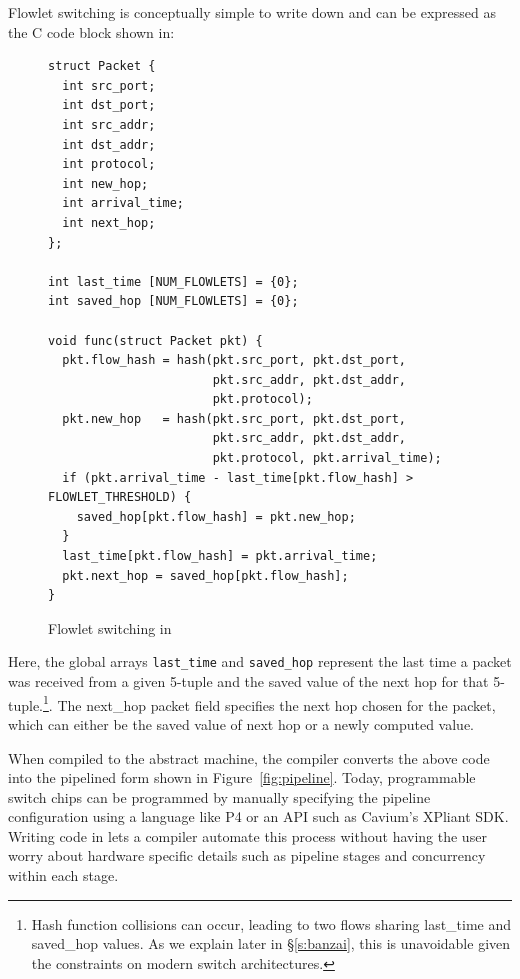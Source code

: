 Flowlet switching is conceptually simple to write down and can be expressed
as the C code block shown in:
\begin{figure}
\begin{small}
\begin{lstlisting}
struct Packet {
  int src_port;
  int dst_port;
  int src_addr;
  int dst_addr;
  int protocol;
  int new_hop;
  int arrival_time;
  int next_hop;
};

int last_time [NUM_FLOWLETS] = {0};
int saved_hop [NUM_FLOWLETS] = {0};

void func(struct Packet pkt) {
  pkt.flow_hash = hash(pkt.src_port, pkt.dst_port,
                       pkt.src_addr, pkt.dst_addr,
                       pkt.protocol);
  pkt.new_hop   = hash(pkt.src_port, pkt.dst_port,
                       pkt.src_addr, pkt.dst_addr,
                       pkt.protocol, pkt.arrival_time);
  if (pkt.arrival_time - last_time[pkt.flow_hash] > FLOWLET_THRESHOLD) {
    saved_hop[pkt.flow_hash] = pkt.new_hop;
  }
  last_time[pkt.flow_hash] = pkt.arrival_time;
  pkt.next_hop = saved_hop[pkt.flow_hash];
}
\end{lstlisting}
\end{small}
\label{fig:flowlet}
\caption{Flowlet switching in \pktlanguage}
\end{figure}

Here, the global arrays \texttt{last\_time} and \texttt{saved\_hop} represent
the last time a packet was received from a given 5-tuple and the saved value of
the next hop for that 5-tuple.\footnote{Hash function collisions can occur,
  leading to two flows sharing last\_time and saved\_hop values. As we explain
later in \S\ref{s:banzai}, this is unavoidable given the constraints on modern
switch architectures.}. The next\_hop packet field specifies the next hop
chosen for the packet, which can either be the saved value of next hop or a
newly computed value.

When compiled to the \absmachine abstract machine, the \pktlanguage compiler
converts the above code into the pipelined form shown in
Figure~\ref{fig:pipeline}. Today, programmable switch chips can be programmed
by manually specifying the pipeline configuration using a language like P4 or
an API such as Cavium's XPliant SDK. Writing code in \pktlanguage lets a
compiler automate this process without having the user worry about hardware
specific details such as pipeline stages and concurrency within each stage.

